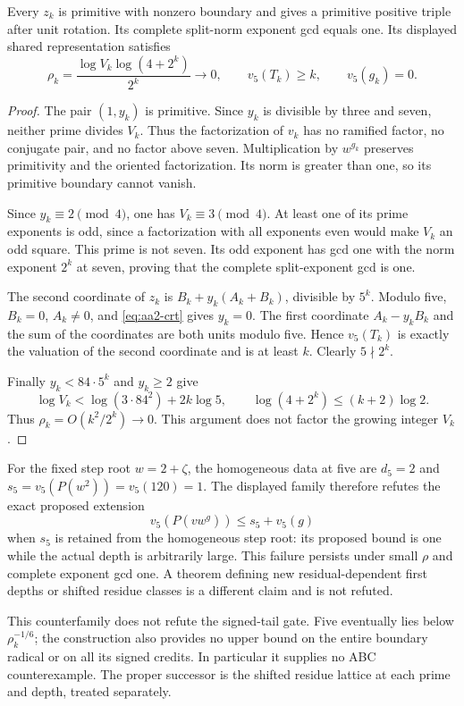 \begin{theorem}
\label{thm:aa2-residual-family}
Every $z_k$ is primitive with nonzero boundary and gives a primitive positive
triple after unit rotation. Its complete split-norm exponent gcd equals one.
Its displayed shared representation satisfies
\[
 \rho_k=\frac{\log V_k\log(4+2^k)}{2^k}\longrightarrow0,
 \qquad v_5(T_k)\ge k,
 \qquad v_5(g_k)=0.
\]
\end{theorem}
\begin{proof}
The pair $(1,y_k)$ is primitive. Since $y_k$ is divisible by three and
seven, neither prime divides $V_k$. Thus the factorization of $v_k$ has no
ramified factor, no conjugate pair, and no factor above seven. Multiplication
by $w^{g_k}$ preserves primitivity and the oriented factorization. Its norm
is greater than one, so its primitive boundary cannot vanish.

Since $y_k\equiv2\pmod4$, one has $V_k\equiv3\pmod4$. At least one of
its prime exponents is odd, since a factorization with all exponents even
would make $V_k$ an odd square. This prime is not seven. Its odd exponent
has gcd one with the norm exponent $2^k$ at seven, proving that the complete
split-exponent gcd is one.

The second coordinate of $z_k$ is $B_k+y_k(A_k+B_k)$, divisible by $5^k$.
Modulo five, $B_k=0$, $A_k\ne0$, and \eqref{eq:aa2-crt} gives $y_k=0$.
The first coordinate $A_k-y_kB_k$ and the sum of the coordinates are both
units modulo five. Hence $v_5(T_k)$ is exactly the valuation of the second
coordinate and is at least $k$. Clearly $5\nmid2^k$.

Finally $y_k<84\cdot5^k$ and $y_k\ge2$ give
\[
 \log V_k<\log(3\cdot84^2)+2k\log5,
 \qquad \log(4+2^k)\le(k+2)\log2.
\]
Thus $\rho_k=O(k^2/2^k)\to0$. This argument does not factor the growing
integer $V_k$.
\end{proof}

For the fixed step root $w=2+\zeta$, the homogeneous data at five are
$d_5=2$ and $s_5=v_5(P(w^2))=v_5(120)=1$. The displayed family therefore
refutes the exact proposed extension
\[
 v_5(P(vw^g))\le s_5+v_5(g)
\]
when $s_5$ is retained from the homogeneous step root: its proposed bound
is one while the actual depth is arbitrarily large. This failure persists
under small $\rho$ and complete exponent gcd one. A theorem defining new
residual-dependent first depths or shifted residue classes is a different
claim and is not refuted.

This counterfamily does not refute the signed-tail gate. Five eventually
lies below $\rho_k^{-1/6}$; the construction also provides no upper bound
on the entire boundary radical or on all its signed credits. In particular
it supplies no ABC counterexample. The proper successor is the shifted
residue lattice at each prime and depth, treated separately.

